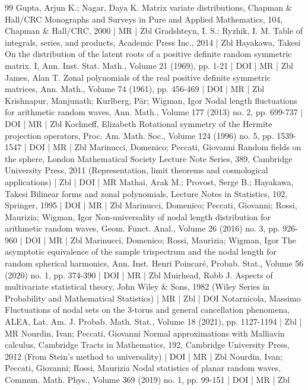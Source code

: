 \documentclass[10pt]{amsart}
\theoremstyle{definition}\newtheorem{defi}[theo]{Definition}\newtheorem{rema}[theo]{Remark}\newtheorem{exam}[theo]{Example}\newtheorem{exem}[theo]{Example}\newtheorem{nota}[theo]{Notation}
\begin{document}
\begin{thebibliography}{99}
 Gupta, Arjun K.; Nagar, Daya K. Matrix variate distributions, Chapman \& Hall/CRC Monographs and Surveys in Pure and Applied Mathematics, 104, Chapman \& Hall/CRC, 2000 | MR | Zbl
 Gradshteyn, I. S.; Ryzhik, I. M. Table of integrals, series, and products, Academic Press Inc., 2014 | Zbl
 Hayakawa, Takesi On the distribution of the latent roots of a positive definite random symmetric matrix. I, Ann. Inst. Stat. Math., Volume 21 (1969), pp. 1-21 | DOI | MR | Zbl
 James, Alan T. Zonal polynomials of the real positive definite symmetric matrices, Ann. Math., Volume 74 (1961), pp. 456-469 | DOI | MR | Zbl
 Krishnapur, Manjunath; Kurlberg, Pär; Wigman, Igor Nodal length fluctuations for arithmetic random waves, Ann. Math., Volume 177 (2013) no. 2, pp. 699-737 | DOI | MR | Zbl
 Kochneff, Elizabeth Rotational symmetry of the Hermite projection operators, Proc. Am. Math. Soc., Volume 124 (1996) no. 5, pp. 1539-1547 | DOI | MR | Zbl
 Marinucci, Domenico; Peccati, Giovanni Random fields on the sphere, London Mathematical Society Lecture Note Series, 389, Cambridge University Press, 2011 (Representation, limit theorems and cosmological applications) | Zbl | DOI | MR
 Mathai, Arak M.; Provost, Serge B.; Hayakawa, Takesi Bilinear forms and zonal polynomials, Lecture Notes in Statistics, 102, Springer, 1995 | DOI | MR | Zbl
 Marinucci, Domenico; Peccati, Giovanni; Rossi, Maurizia; Wigman, Igor Non-universality of nodal length distribution for arithmetic random waves, Geom. Funct. Anal., Volume 26 (2016) no. 3, pp. 926-960 | DOI | MR | Zbl
 Marinucci, Domenico; Rossi, Maurizia; Wigman, Igor The asymptotic equivalence of the sample trispectrum and the nodal length for random spherical harmonics, Ann. Inst. Henri Poincaré, Probab. Stat., Volume 56 (2020) no. 1, pp. 374-390 | DOI | MR | Zbl
 Muirhead, Robb J. Aspects of multivariate statistical theory, John Wiley \& Sons, 1982 (Wiley Series in Probability and Mathematical Statistics) | MR | Zbl | DOI
 Notarnicola, Massimo Fluctuations of nodal sets on the 3-torus and general cancellation phenomena, ALEA, Lat. Am. J. Probab. Math. Stat., Volume 18 (2021), pp. 1127-1194 | Zbl | MR
 Nourdin, Ivan; Peccati, Giovanni Normal approximations with Malliavin calculus, Cambridge Tracts in Mathematics, 192, Cambridge University Press, 2012 (From Stein’s method to universality) | DOI | MR | Zbl
 Nourdin, Ivan; Peccati, Giovanni; Rossi, Maurizia Nodal statistics of planar random waves, Commun. Math. Phys., Volume 369 (2019) no. 1, pp. 99-151 | DOI | MR | Zbl

\end{thebibliography}
\end{document}
